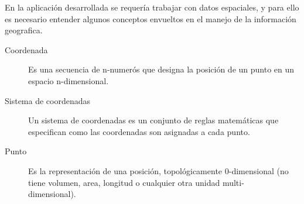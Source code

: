     En la aplicaci\'on desarrollada se requería trabajar con datos espaciales, y para ello es necesario entender algunos conceptos envueltos en el manejo de la informaci\'on geografica.

    \begin{description}
      \item[Coordenada] Es una secuencia de n-numer\'os que designa la posici\'on de un punto en un espacio n-dimensional. \\
      \item[Sistema de coordenadas] Un sistema de coordenadas es  un conjunto de reglas matemáticas que especifican como las coordenadas son asignadas  a cada  punto.
      \item[Punto] Es  la representaci\'on de una posici\'on, topol\'ogicamente 0-dimensional (no tiene volumen, area, longitud o cualquier otra unidad multi-\\dimensional).
    \end{description}





